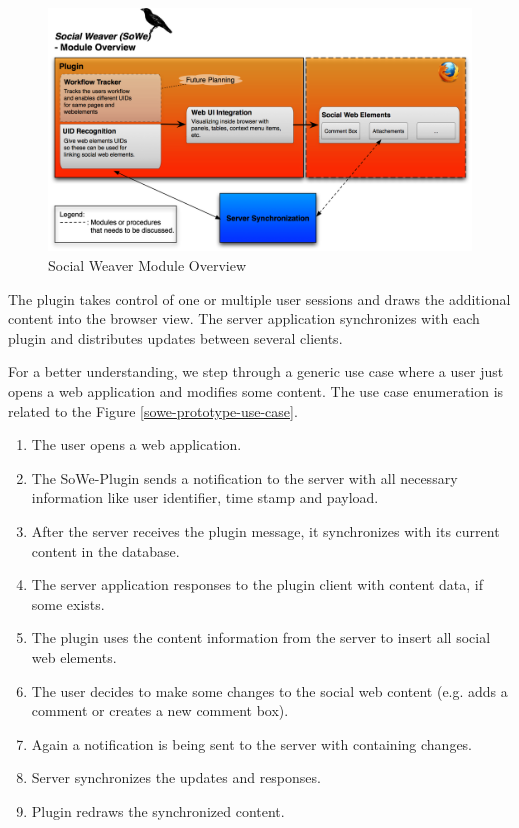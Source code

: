 \begin{figure}\centering
		\includegraphics[width=13cm]{images/sowe-module-overview.png}
		\caption{Social Weaver Module Overview}
		\label{msowe-module-overview}
\end{figure} 

The plugin takes control of one or multiple user sessions and draws the additional content into the browser view. The server application synchronizes with each plugin and distributes updates between several clients. 

For a better understanding, we step through a generic use case where a user just opens a web application and modifies some content. The use case enumeration is related to the Figure \ref{sowe-prototype-use-case}.

\begin{enumerate}
\item The user opens a web application.
\item The SoWe-Plugin sends a notification to the server with all necessary information like user identifier, time stamp and payload.
\item After the server receives the plugin message, it synchronizes with its current content in the database.
\item The server application responses to the plugin client with content data, if some exists.
\item The plugin uses the content information from the server to insert all social web elements.
\item The user decides to make some changes to the social web content (e.g. adds a comment or creates a new comment box).
\item Again a notification is being sent to the server with containing changes.
\item Server synchronizes the updates and responses.
\item Plugin redraws the synchronized content.
\end{enumerate}

